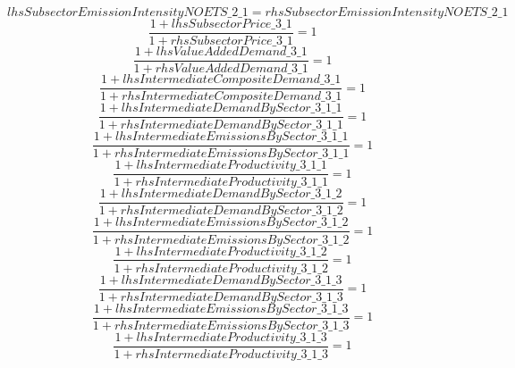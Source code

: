 \begin{dmath}
{lhsSubsectorEmissionIntensityNOETS\_2\_1}={rhsSubsectorEmissionIntensityNOETS\_2\_1}
\end{dmath}
\begin{dmath}
\frac{1+{lhsSubsectorPrice\_3\_1}}{1+{rhsSubsectorPrice\_3\_1}}=1
\end{dmath}
\begin{dmath}
\frac{1+{lhsValueAddedDemand\_3\_1}}{1+{rhsValueAddedDemand\_3\_1}}=1
\end{dmath}
\begin{dmath}
\frac{1+{lhsIntermediateCompositeDemand\_3\_1}}{1+{rhsIntermediateCompositeDemand\_3\_1}}=1
\end{dmath}
\begin{dmath}
\frac{1+{lhsIntermediateDemandBySector\_3\_1\_1}}{1+{rhsIntermediateDemandBySector\_3\_1\_1}}=1
\end{dmath}
\begin{dmath}
\frac{1+{lhsIntermediateEmissionsBySector\_3\_1\_1}}{1+{rhsIntermediateEmissionsBySector\_3\_1\_1}}=1
\end{dmath}
\begin{dmath}
\frac{1+{lhsIntermediateProductivity\_3\_1\_1}}{1+{rhsIntermediateProductivity\_3\_1\_1}}=1
\end{dmath}
\begin{dmath}
\frac{1+{lhsIntermediateDemandBySector\_3\_1\_2}}{1+{rhsIntermediateDemandBySector\_3\_1\_2}}=1
\end{dmath}
\begin{dmath}
\frac{1+{lhsIntermediateEmissionsBySector\_3\_1\_2}}{1+{rhsIntermediateEmissionsBySector\_3\_1\_2}}=1
\end{dmath}
\begin{dmath}
\frac{1+{lhsIntermediateProductivity\_3\_1\_2}}{1+{rhsIntermediateProductivity\_3\_1\_2}}=1
\end{dmath}
\begin{dmath}
\frac{1+{lhsIntermediateDemandBySector\_3\_1\_3}}{1+{rhsIntermediateDemandBySector\_3\_1\_3}}=1
\end{dmath}
\begin{dmath}
\frac{1+{lhsIntermediateEmissionsBySector\_3\_1\_3}}{1+{rhsIntermediateEmissionsBySector\_3\_1\_3}}=1
\end{dmath}
\begin{dmath}
\frac{1+{lhsIntermediateProductivity\_3\_1\_3}}{1+{rhsIntermediateProductivity\_3\_1\_3}}=1
\end{dmath}
